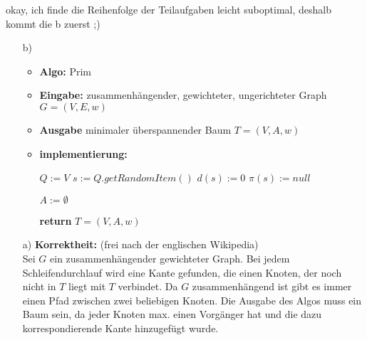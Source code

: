 \documentclass[10pt,a4paper]{article}
\begin{document}
    okay, ich finde die Reihenfolge der Teilaufgaben leicht suboptimal,
    deshalb kommt die b zuerst ;) \\
    \begin{itemize}
        \item[b)]
            \begin{itemize}
            \item \textbf{Algo: } Prim \\
            \item \textbf{Eingabe: } zusammenhängender, gewichteter, ungerichteter Graph $G =(V,E,w)$ \\
            \item \textbf{Ausgabe} minimaler überspannender Baum $T = (V,A,w)$\\
            \item \textbf{implementierung: } \\
            
                \begin{algorithm}[H]
                    
                    $Q := V$\;
                    $s := Q.getRandomItem()$\;
                    $d(s) := 0$\;
                    $\pi (s):= null$\;
                    
                    $A := \emptyset$\;
                    
                    \textbf{return} $T = (V,A,w)$ \;
                
                \end{algorithm}

            
            \end{itemize}
            
            \item[a)]
                \textbf{Korrektheit:} (frei nach der englischen Wikipedia)\\
                    Sei $G$ ein zusammenhängender gewichteter Graph.
                    Bei jedem Schleifendurchlauf wird eine Kante gefunden, die einen
                    Knoten, der noch nicht in $T$ liegt mit $T$ verbindet.
                    Da $G$ zusammenhängend ist gibt es immer einen Pfad zwischen
                    zwei beliebigen Knoten. Die Ausgabe des Algos muss ein Baum sein,
                    da jeder Knoten max. einen Vorgänger hat und die dazu korrespondierende
                    Kante hinzugefügt wurde.\\
                    

\end{itemize}
\end{document}
